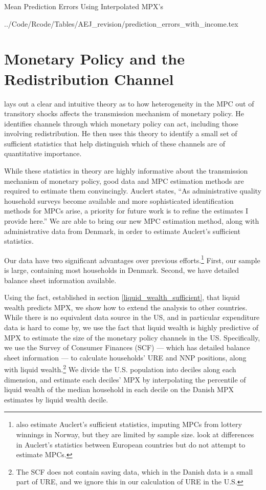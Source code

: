 \documentclass[titlepage]{\econtex}\newcommand{\texname}{ConsumptionHeterogeneity}
\newcommand{\tabdir}{../Code/Rcode/Tables/AEJ_revision}
\begin{document}
	\begin{center}
		\begin{table}
			\caption{Mean Prediction Errors Using Interpolated MPX's}
			\label{table:prediction_errors}
			\begin{center}
				 \tabdir/prediction_errors_with_income.tex
			\end{center}
		\end{table}
	\end{center}
	
	\section{Monetary Policy and the Redistribution Channel} \label{monetary_policy}
	\cite{auclert_monetary_2017} lays out a clear and intuitive theory as to how heterogeneity in the MPC out of transitory shocks affects the transmission mechanism of monetary policy. He identifies channels through which monetary policy can act, including those involving redistribution. He then uses this theory to identify a small set of sufficient statistics that help distinguish which of these channels are of quantitative importance.
	
	While these statistics in theory are highly informative about the transmission mechanism of monetary policy, good data and MPC estimation methods are required to estimate them convincingly. Auclert states, ``As administrative quality household surveys become available and more sophisticated identification methods for MPCs arise, a priority for future work is to refine the estimates I provide here.'' We are able to bring our new MPC estimation method, along with administrative data from Denmark, in order to estimate Auclert's sufficient statistics.
	
	Our data have two significant advantages over previous efforts.\footnote{\cite{fagereng_mpc_2016} also estimate Auclert's sufficient statistics, imputing MPCs from lottery winnings in Norway, but they are limited by sample size. \cite{ampudia_monetary_2018} look at differences in Auclert's statistics between European countries but do not attempt to estimate MPCs.} First, our sample is large, containing most households in Denmark. Second, we have detailed balance sheet information available.
	
	Using the fact, established in section \ref{liquid_wealth_sufficient}, that liquid wealth predicts MPX, we show how to extend the analysis to other countries. While there is no equivalent data source in the US, and in particular expenditure data is hard to come by, we use the fact that liquid wealth is highly predictive of MPX to estimate the size of the monetary policy channels in the US. Specifically, we use the Survey of Consumer Finances (SCF) --- which has detailed balance sheet information --- to calculate households' URE and NNP positions, along with liquid wealth.\footnote{The SCF does not contain saving data, which in the Danish data is a small part of URE, and we ignore this in our calculation of URE in the U.S.} We divide the U.S. population into deciles along each dimension, and estimate each deciles' MPX by interpolating the percentile of liquid wealth of the median household in each decile on the Danish MPX estimates by liquid wealth decile.
	
\end{document}
